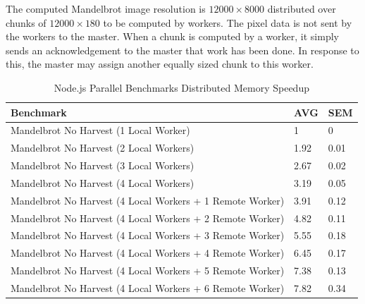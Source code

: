 \documentclass[oneside]{um-fict}
\begin{document}
The computed Mandelbrot image resolution is $12000 \times 8000$ distributed over chunks of $12000 \times 180$ to be computed by workers. The pixel data is not sent by the workers to the master. When a chunk is computed by a worker, it simply sends an acknowledgement to the master that work has been done. In response to this, the master may assign another equally sized chunk to this worker.
\begin{table}[H]
    \begin{center}
        \begin{tabular}{|l|ll|}
            \hline
            Benchmark                                                   & AVG & SEM \\ \hline
            Mandelbrot No Harvest (1 Local Worker)                      & 1       & 0              \\
            Mandelbrot No Harvest (2 Local Workers)                     & 1.92    & 0.01           \\
            Mandelbrot No Harvest (3 Local Workers)                     & 2.67    & 0.02           \\
            Mandelbrot No Harvest (4 Local Workers)                     & 3.19    & 0.05           \\
            Mandelbrot No Harvest (4 Local Workers + 1 Remote Worker) & 3.91    & 0.12           \\
            Mandelbrot No Harvest (4 Local Workers + 2 Remote Worker) & 4.82    & 0.11           \\
            Mandelbrot No Harvest (4 Local Workers + 3 Remote Worker) & 5.55    & 0.18           \\
            Mandelbrot No Harvest (4 Local Workers + 4 Remote Worker) & 6.45    & 0.17            \\
            Mandelbrot No Harvest (4 Local Workers + 5 Remote Worker) & 7.38    & 0.13            \\
            Mandelbrot No Harvest (4 Local Workers + 6 Remote Worker) & 7.82    & 0.34           \\ \hline
        \end{tabular}
        \caption{Node.js Parallel Benchmarks Distributed Memory Speedup}\label{tab:nodedistributedmemoryspeedup}
    \end{center}
\end{table}
\end{document}
